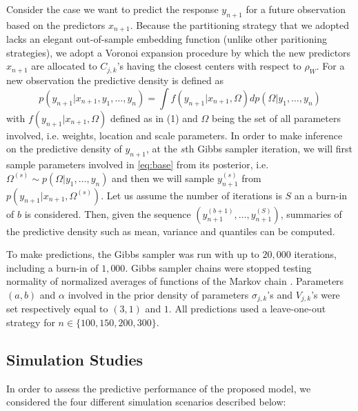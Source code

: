 Consider the case we want to predict the response $y_{n+1}$ for a future observation based on the predictors $x_{n+1}$. Because the partitioning strategy that we adopted lacks an elegant out-of-sample embedding function (unlike other paritioning strategies), we adopt a Voronoi expansion procedure by which  the new predictors $x_{n+1}$ are allocated to $C_{j,k}$'s having the closest centers with respect to $\rho_W$. For a new observation the predictive density is defined as
\begin{equation*}
	p(y_{n+1}|x_{n+1}, y_1, \ldots, y_n) = \int f\left(y_{n+1}|x_{n+1},\Omega\right) dp\left(\Omega|y_1, \ldots, y_n\right) \label{predictive:MSB}
	\end{equation*}
with $f\left(y_{n+1}|x_{n+1},\Omega\right)$ defined as in (1) and $\Omega$ being the set of all parameters involved, i.e. weights, location and scale parameters. In order to make inference on the predictive density of $y_{n+1}$, at the $s$th  Gibbs sampler iteration, we will first sample parameters involved in \ref{eq:base} from its posterior, i.e. $\Omega^{(s)} \sim p\left(\Omega|y_1, \ldots, y_n\right)$ and then we will sample $y^{(s)}_{n+1}$ from $ p\left(y_{n+1}|x_{n+1},\Omega^{(s)}\right)$. Let us assume the number of iterations is $S$ an a burn-in of $b$ is considered. Then, given the sequence $\left(y^{(b+1)}_{n+1}, \ldots, y^{(S)}_{n+1}\right)$, summaries of the predictive density such as mean, variance and quantiles can be computed. 

To make predictions,
the Gibbs sampler was run with up to $20,000$ iterations, including a burn-in of $1,000$. Gibbs sampler chains were stopped testing normality of normalized averages of functions of the Markov chain \cite{Chauveau98anautomated}. Parameters $(a,b)$ and $\alpha$ involved in the prior density of parameters $\sigma_{j,k}$'s and $V_{j,k}$'s were set respectively equal to $(3,1)$ and $1$. All predictions used a leave-one-out strategy for $n \in \{100, 150, 200, 300\}$.


\subsection{Simulation Studies}\label{sec:sim}

In order to assess the predictive performance of the proposed model, we considered the four different simulation scenarios described below: 

